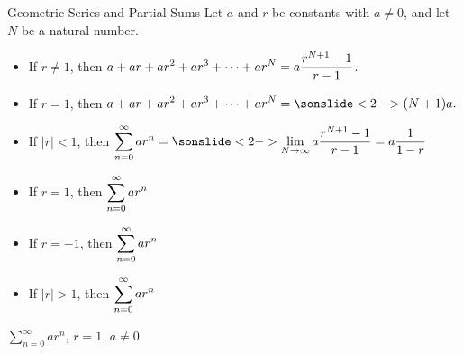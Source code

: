 \begin{frame}[t]
\begin{block}{Geometric Series and Partial Sums}
Let $a$ and $r$ be constants with $a \neq 0$, and let $N$ be a natural number.
\begin{itemize}
\item If $r \neq 1$, then $\displaystyle a+ar+ar^2+ar^3+\cdots+ar^N=a\frac{r^{N+1}-1}{r-1}$.
\item If $r = 1$, then $\ds a+ar+ar^2+ar^3+\cdots+ar^N=
\sonslide<2->{(N+1)a.}$
\item If $|r|<1$, then $\ds\sum_{n=0}^\infty ar^n=\sonslide<2->{
\lim_{N \to \infty}a\frac{r^{N+1}-1}{r-1}=a\frac{1}{1-r}}$
\item If $r=1$, then $\displaystyle\sum_{n=0}^\infty ar^n$ 
\item If $r=-1$, then $\displaystyle\sum_{n=0}^\infty ar^n$ 
\item If $|r|>1$, then $\displaystyle\sum_{n=0}^\infty ar^n$ 
\end{itemize}
\end{block}
\end{frame}
\begin{frame}[t]{$\sum\limits_{n=0}^\infty ar^n$, $r=1$, $a\neq 0$}


\end{frame}

